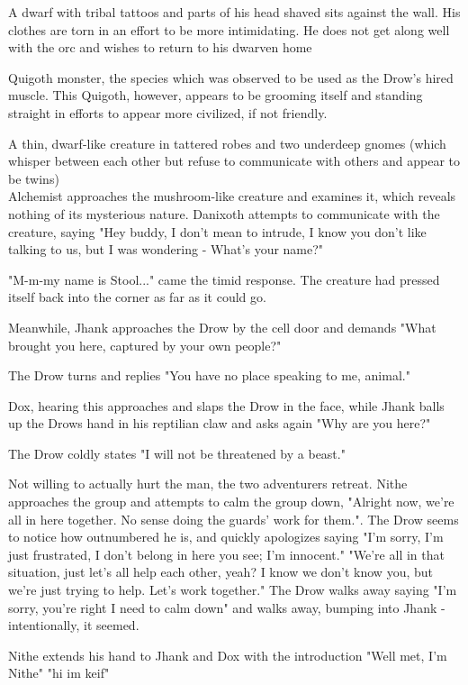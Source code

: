 \documentclass[letterpaper,10pt,twoside,twocolumn,openany]{book}
\begin{document}
A dwarf with tribal tattoos and parts of his head shaved sits against the wall. His clothes are torn in an effort to be more intimidating. He does not get along well with the orc and wishes to return to his dwarven home

Quigoth monster, the species which was observed to be used as the Drow's hired muscle. This Quigoth, however, appears to be grooming itself and standing straight in efforts to appear more civilized, if not friendly.

A thin, dwarf-like creature in tattered robes and two underdeep gnomes (which whisper between each other but refuse to communicate with others and appear to be twins)\\

Alchemist approaches the mushroom-like creature and examines it, which reveals nothing of its mysterious nature. Danixoth attempts to communicate with the creature, saying "Hey buddy, I don't mean to intrude, I know you don't like talking to us, but I was wondering - What's your name?"

"M-m-my name is Stool..." came the timid response. The creature had pressed itself back into the corner as far as it could go.

Meanwhile, Jhank approaches the Drow by the cell door and demands "What brought you here, captured by your own people?"

The Drow turns and replies "You have no place speaking to me, animal."

Dox, hearing this approaches and slaps the Drow in the face, while Jhank balls up the Drows hand in his reptilian claw and asks again "Why are you here?"

The Drow coldly states "I will not be threatened by a beast."

Not willing to actually hurt the man, the two adventurers retreat. Nithe approaches the group and attempts to calm the group down, "Alright now, we're all in here together. No sense doing the guards' work for them.". The Drow seems to notice how outnumbered he is, and quickly apologizes saying "I'm sorry, I'm just frustrated, I don't belong in here you see; I'm innocent."
"We're all in that situation, just let's all help each other, yeah? I know we don't know you, but we're just trying to help. Let's work together."
The Drow walks away saying "I'm sorry, you're right I need to calm down" and walks away, bumping into Jhank - intentionally, it seemed.

Nithe extends his hand to Jhank and Dox with the introduction "Well met, I'm Nithe" "hi im keif"
\end{document}
